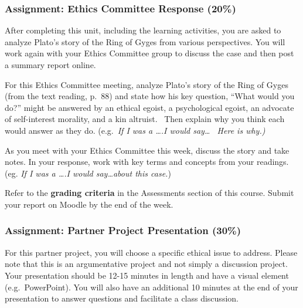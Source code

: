 \documentclass[
]{book}
\begin{document}
\begin{assessment}
\hypertarget{assignment-ethics-committee-response-20-1}{%
\subsubsection*{Assignment: Ethics Committee Response (20\%)}\label{assignment-ethics-committee-response-20-1}}

After completing this unit, including the learning activities, you are asked to
analyze Plato's story of the Ring of Gyges from various perspectives. You will
work again with your Ethics Committee group to discuss the case and then post a
summary report online.

For this Ethics Committee meeting, analyze Plato's story of the Ring of Gyges (from the text reading, p.~88) and state how his key question, ``What would you do?'' might be answered by an ethical egoist, a psychological egoist, an advocate of self-interest morality, and a kin altruist. ~Then explain why you think each would answer as they do. (e.g.~\emph{If I was a \ldots.I would say\ldots{} ~Here is why.)}

As you meet with your Ethics Committee this week, discuss the story and take
notes. In your response, work with key terms and concepts from your readings.
(eg. \emph{If I was a \ldots.I would say\ldots about this case.})

Refer to the \textbf{grading criteria} in the Assessments section of this course.
Submit your report on Moodle by the end of the week.

\hypertarget{assignment-partner-project-presentation-30}{%
\subsubsection*{Assignment: Partner Project Presentation (30\%)}\label{assignment-partner-project-presentation-30}}

For this partner project, you will choose a specific ethical issue to address.
Please note that this is an argumentative project and not simply a discussion
project. Your presentation should be 12-15 minutes in length and have a visual
element (e.g.~PowerPoint). You will also have an additional 10 minutes at the
end of your presentation to answer questions and facilitate a class discussion.


\end{assessment}
\end{document}
